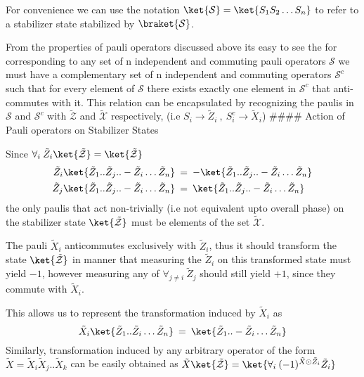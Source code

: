 \documentclass[
]{article}
\begin{document}
For convenience we can use the notation
\(\ket{\mathcal{S}} = \ket{S_{1}S_{2} \dots S_n}\) to refer to a
stabilizer state stabilized by \(\braket{\mathcal{S}}\).

From the properties of pauli operators discussed above its easy to see
the for corresponding to any set of n independent and commuting pauli
operators \(\mathcal{S}\) we must have a complementary set of n
independent and commuting operators \(\mathcal{S}^c\) such that for
every element of \(\mathcal{S}\) there exists exactly one element in
\(\mathcal{S}^c\) that anti-commutes with it. This relation can be
encapsulated by recognizing the paulis in \(\mathcal{S}\) and
\(\mathcal{S}^{c}\) with \(\mathcal{\tilde{Z}}\) and
\(\mathcal{\tilde{X}}\) respectively, (i.e
\(S_{i}\to \tilde{Z}_{i}\:, \: S^{c}_{i} \to \tilde{X}_{i}\)) \#\#\#\#
Action of Pauli operators on Stabilizer States

Since
\(\forall_{i} \: \tilde{Z}_{i} \ket{\tilde{\mathcal{Z}}} = \ket{\tilde{\mathcal{Z}}}\)
\[\begin{align} \tilde{Z}_{i}  \ket{\tilde{Z}_{1}.. \tilde{Z}_{j} .. -\tilde{Z}_{i}\dots \tilde{Z}_{n}}  \: &= \: -\ket{\tilde{Z}_{1}.. \tilde{Z}_{j}..-\tilde{Z}_{i}\dots \tilde{Z}_{n}}  \\ \tilde{Z}_{j}  \ket{\tilde{Z}_{1}.. \tilde{Z}_{j} .. -\tilde{Z}_{i}\dots \tilde{Z}_{n}}  \: &= \: \ket{\tilde{Z}_{1}.. \tilde{Z}_{j}..-\tilde{Z}_{i}\dots \tilde{Z}_{n}} \end{align}\]
the only paulis that act non-trivially (i.e not equivalent upto overall
phase) on the stabilizer state \(\ket{\mathcal{\tilde{Z}}}\) must be
elements of the set \(\mathcal{\tilde{X}}\).

The pauli \(\tilde{X}_i\) anticommutes exclusively with
\(\tilde{Z}_{i}\), thus it should transform the state
\(\ket{\mathcal{\tilde{Z}}}\) in manner that measuring the
\(\tilde{Z}_i\) on this transformed state must yield \(-1\), however
measuring any of \(\forall_{j \neq i} \:\tilde{Z}_{j}\) should still
yield \(+1\), since they commute with \(\tilde{X}_i\).

This allows us to represent the transformation induced by
\(\tilde{X}_{i}\) as
\[\tilde{X}_{i} \ket{\tilde{Z}_{1}.. \tilde{Z}_{i}\dots \tilde{Z}_{n}}  \: = \: \ket{\tilde{Z}_{1}.. -\tilde{Z}_{i}\dots \tilde{Z}_{n}}\]
Similarly, transformation induced by any arbitrary operator of the form
\(\tilde{X} = \tilde{X}_{i}\tilde{X}_{j} ..\tilde{X}_k\) can be easily
obtained as
\(\tilde{X} \ket{\tilde{\mathcal{Z}}} = \ket{ \forall_{i} \: (-1)^{\tilde{X} \odot \tilde{Z}_i}\tilde{Z}_{i}}\)
\end{document}

